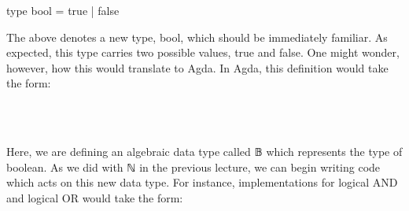 \documentclass{lecturenotes}
\newcommand{\agdanats}{\textsf{ℕ}\xspace}
\newcommand{\agdabool}{\textsf{𝔹}\xspace}
\begin{document}
\begin{center}
    \textsf{type bool = true | false}
\end{center}

The above denotes a new type, bool, which should be immediately familiar.
As expected, this type carries two possible values, true and false.
One might wonder, however, how this would translate to Agda.
In Agda, this definition would take the form:

\begin{center}
    \begin{code}%
%
\>[8]\AgdaSpace{}%
\AgdaSpace{}%
\AgdaSymbol{:}\AgdaSpace{}%
\AgdaSpace{}%
\<%
\\
\>[8][@{}l@{\AgdaIndent{0}}]%
\>[12]\AgdaSpace{}%
\AgdaSymbol{:}\AgdaSpace{}%
\<%
\\
%
\>[12]\AgdaSpace{}%
\AgdaSymbol{:}\AgdaSpace{}%
\<%
\end{code}
\end{center}

Here, we are defining an algebraic data type called \agdabool which represents the type of boolean.
As we did with \agdanats in the previous lecture, we can begin writing code which acts on this new data type.
For instance, implementations for logical AND and logical OR would take the form:

\begin{center}
    \begin{code}%
%
\>[8]\AgdaOperator{\AgdaFunction{\AgdaUnderscore{}\&\&\AgdaUnderscore{}}}\AgdaSpace{}%
\AgdaSymbol{:}\AgdaSpace{}%
\AgdaSpace{}%
\AgdaSymbol{->}\AgdaSpace{}%
\AgdaSpace{}%
\AgdaSymbol{->}\AgdaSpace{}%
\<%
\\
%
\>[8]\AgdaSpace{}%
\AgdaOperator{\AgdaFunction{\&\&}}\AgdaSpace{}%
\AgdaSpace{}%
\AgdaSymbol{=}\AgdaSpace{}%
\<%
\\
%
\>[8]\AgdaSpace{}%
\AgdaOperator{\AgdaFunction{\&\&}}\AgdaSpace{}%
\AgdaSpace{}%
\AgdaSymbol{=}\AgdaSpace{}%
\<%
\\
%
\\[\AgdaEmptyExtraSkip]%
%
\>[8]\AgdaOperator{\AgdaFunction{\AgdaUnderscore{}||\AgdaUnderscore{}}}\AgdaSpace{}%
\AgdaSymbol{:}\AgdaSpace{}%
\AgdaSpace{}%
\AgdaSymbol{->}\AgdaSpace{}%
\AgdaSpace{}%
\AgdaSymbol{->}\AgdaSpace{}%
\<%
\\
%
\>[8]\AgdaSpace{}%
\AgdaOperator{\AgdaFunction{||}}\AgdaSpace{}%
\AgdaSpace{}%
\AgdaSymbol{=}\AgdaSpace{}%
\<%
\\
%
\>[8]\AgdaSpace{}%
\AgdaOperator{\AgdaFunction{||}}\AgdaSpace{}%
\AgdaSpace{}%
\AgdaSymbol{=}\AgdaSpace{}%
\<%
\end{code}
\end{center}
\end{document}
